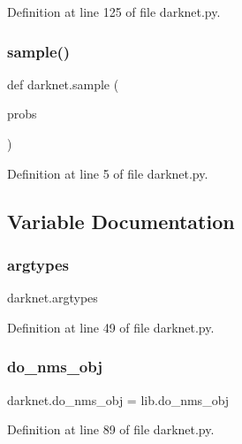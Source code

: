 Definition at line 125 of file darknet.\+py.

\mbox{\label{namespacedarknet_ab65a52b5c81d82e6149ba8882d5ac84a}} 
\subsubsection{\texorpdfstring{sample()}{sample()}}
{\footnotesize\ttfamily def darknet.\+sample (\begin{DoxyParamCaption}\item[{}]{probs }\end{DoxyParamCaption})}



Definition at line 5 of file darknet.\+py.



\subsection{Variable Documentation}
\mbox{\label{namespacedarknet_a4e9a5fc4a3c6b775fdfa9eaee9aaf382}} 
\subsubsection{\texorpdfstring{argtypes}{argtypes}}
{\footnotesize\ttfamily darknet.\+argtypes}



Definition at line 49 of file darknet.\+py.

\mbox{\label{namespacedarknet_acb4a34668c7ee14161302ee07f3a322a}} 
\subsubsection{\texorpdfstring{do\_nms\_obj}{do\_nms\_obj}}
{\footnotesize\ttfamily darknet.\+do\+\_\+nms\+\_\+obj = lib.\+do\+\_\+nms\+\_\+obj}



Definition at line 89 of file darknet.\+py.

\mbox{\label{namespacedarknet_ac69cf6b9f363f348b3f05e4ad183a873}} 
